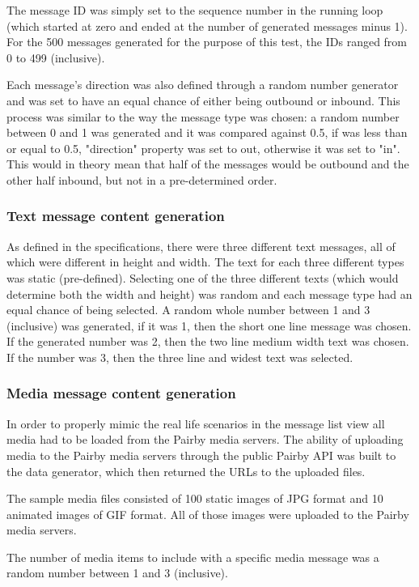 \documentclass[a4paper,12pt]{article}
\begin{document}
The message ID was simply set to the sequence number in the running loop (which started at zero and ended at the number of generated messages minus 1). For the 500 messages generated for the purpose of this test, the IDs ranged from 0 to 499 (inclusive).

Each message's direction was also defined through a random number generator and was set to have an equal chance of either being outbound or inbound. This process was similar to the way the message type was chosen: a random number between 0 and 1 was generated and it was compared against 0.5, if was less than or equal to 0.5, "direction" property was set to out, otherwise it was set to "in". This would in theory mean that half of the messages would be outbound and the other half inbound, but not in a pre-determined order.

\subsubsection*{Text message content generation}
As defined in the specifications, there were three different text messages, all of which were different in height and width. The text for each three different types was static (pre-defined). Selecting one of the three different texts (which would determine both the width and height) was random and each message type had an equal chance of being selected. A random whole number between 1 and 3 (inclusive) was generated, if it was 1, then the short one line message was chosen. If the generated number was 2, then the two line medium width text was chosen. If the number was 3, then the three line and widest text was selected.

\subsubsection*{Media message content generation}
In order to properly mimic the real life scenarios in the message list view all media had to be loaded from the Pairby media servers. The ability of uploading media to the Pairby media servers through the public Pairby API was built to the data generator, which then returned the URLs to the uploaded files.

The sample media files consisted of 100 static images of JPG format and 10 animated images of GIF format. All of those images were uploaded to the Pairby media servers.

The number of media items to include with a specific media message was a random number between 1 and 3 (inclusive).
\end{document}
